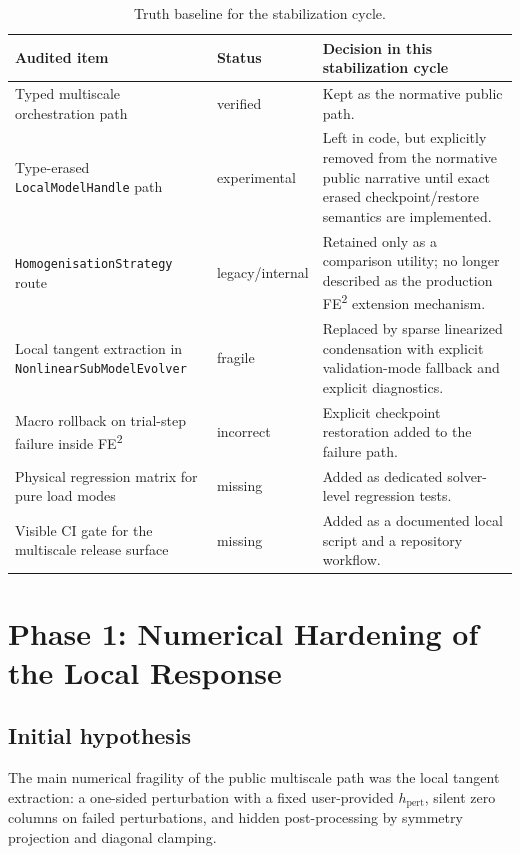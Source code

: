 \begin{table}[htb]
\centering
\small
\begin{tabular}{p{}p{}p{}}
\toprule
Audited item & Status & Decision in this stabilization cycle \\
\midrule
Typed multiscale orchestration path &
verified &
Kept as the normative public path. \\
Type-erased \texttt{LocalModelHandle} path &
experimental &
Left in code, but explicitly removed from the normative public narrative until
exact erased checkpoint/restore semantics are implemented. \\
\texttt{HomogenisationStrategy} route &
legacy/internal &
Retained only as a comparison utility; no longer described as the production
FE\textsuperscript{2} extension mechanism. \\
Local tangent extraction in
\texttt{NonlinearSubModelEvolver} &
fragile &
Replaced by sparse linearized condensation with explicit validation-mode
fallback and explicit diagnostics. \\
Macro rollback on trial-step failure inside FE\textsuperscript{2} &
incorrect &
Explicit checkpoint restoration added to the failure path. \\
Physical regression matrix for pure load modes &
missing &
Added as dedicated solver-level regression tests. \\
Visible CI gate for the multiscale release surface &
missing &
Added as a documented local script and a repository workflow. \\
\bottomrule
\end{tabular}
\caption{Truth baseline for the stabilization cycle.}
\label{tab:ms-stab-truth-baseline}
\end{table}

\section{Phase 1: Numerical Hardening of the Local Response}
\label{sec:ms-stab-phase1}

\subsection{Initial hypothesis}

The main numerical fragility of the public multiscale path was the local
tangent extraction: a one-sided perturbation with a fixed user-provided
\(h_{\mathrm{pert}}\), silent zero columns on failed perturbations, and hidden
post-processing by symmetry projection and diagonal clamping.

